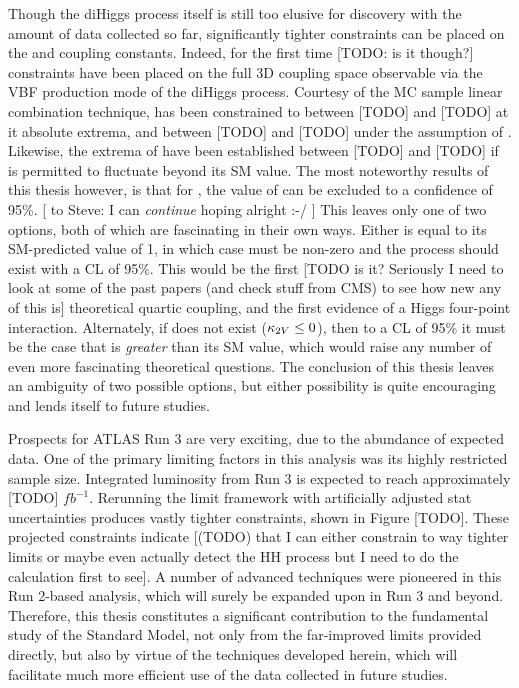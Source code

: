 Though the diHiggs process itself is still too elusive for discovery with the amount of data collected so far,
    significantly tighter constraints can be placed on the \kvv and \kl coupling constants.
Indeed, for the first time [TODO: is it though?] constraints have been placed on the full
    3D coupling space observable via the VBF production mode of the diHiggs process.
Courtesy of the MC sample linear combination technique,
    \kl has been constrained to between [TODO] and [TODO] at it absolute extrema,
    and between [TODO] and [TODO] under the assumption of .
Likewise, the extrema of \kvv have been established between [TODO] and [TODO] if \kl is permitted to fluctuate beyond its SM value.
The most noteworthy results of this thesis however, is that for ,
    the value of  can be excluded to a confidence of 95\%. [ to Steve: I can \textit{continue} hoping alright :-/ ]
This leaves only one of two options, both of which are fascinating in their own ways.
Either \kl is equal to its SM-predicted value of 1,
    in which case \kvv must be non-zero and the \HHVV process should exist with a CL of 95\%.
This would be the first
    [TODO is it? Seriously I need to look at some of the past papers (and check stuff from CMS) to see how new any of this is]
    theoretical quartic coupling,
    and the first evidence of a Higgs four-point interaction.
Alternately, if \kvv does not exist ($\kappa_{2V} \leq 0$), then to a CL of 95\% it must be the case
    that \kl is \textit{greater} than its SM value, which would raise any number of even more fascinating theoretical questions.
The conclusion of this thesis leaves an ambiguity of two possible options,
    but either possibility is quite encouraging and lends itself to future studies.

Prospects for ATLAS Run 3 are very exciting, due to the abundance of expected data.
One of the primary limiting factors in this analysis was its highly restricted sample size.
Integrated luminosity from Run 3 is expected to reach approximately [TODO] $\textit{fb}^{-1}$.
Rerunning the limit framework with artificially adjusted stat uncertainties produces vastly tighter constraints,
    shown in Figure [TODO].
These projected constraints indicate [(TODO) that I can either constrain to way tighter limits or maybe even actually detect the HH process
    but I need to do the calculation first to see].
A number of advanced techniques were pioneered in this Run 2-based analysis,
    which will surely be expanded upon in Run 3 and beyond.
Therefore, this thesis constitutes a significant contribution to the fundamental study of the Standard Model,
    not only from the far-improved limits provided directly,
    but also by virtue of the techniques developed herein,
    which will facilitate much more efficient use of the data collected in future studies.


